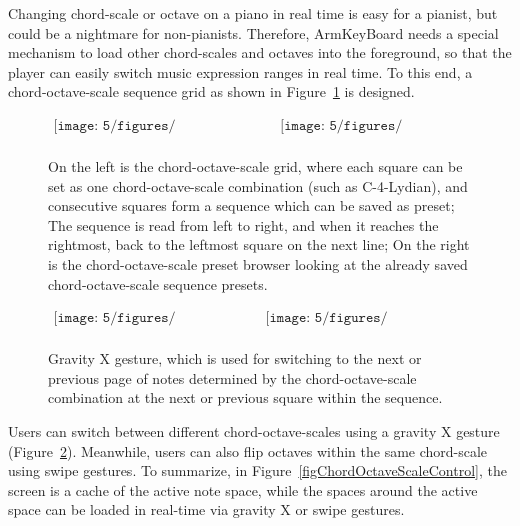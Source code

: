 Changing chord-scale or octave on a piano in real time is easy for a pianist, but could be a nightmare for non-pianists. Therefore, ArmKeyBoard needs a special mechanism to load other chord-scales and octaves into the foreground, so that the player can easily switch music expression ranges in real time. To this end, a chord-octave-scale sequence grid as shown in Figure~\ref{fig:5-cosgrid} is designed.
\begin{figure}[htbp]
\begin{center}$
\begin{array}{cc}
    \texttt{[image: 5/figures/ChordOctaveScaleGrid.PNG]} &
    \texttt{[image: 5/figures/ChordScalePreset.PNG]}\\
\end{array}$
\end{center}
\caption{On the left is the chord-octave-scale grid, where each square can be set as one chord-octave-scale
combination (such as C-4-Lydian), and consecutive squares form a sequence which can be saved as preset; The sequence is read from left to right, and when it reaches the rightmost, back to the leftmost square on the next line; On the right is the chord-octave-scale preset browser looking at the already saved chord-octave-scale sequence presets.}
\label{fig:5-cosgrid}
\end{figure}

\begin{figure}[htbp]
\begin{center}$
\begin{array}{cc}
\texttt{[image: 5/figures/Gravity0.jpg]} &
\texttt{[image: 5/figures/GravityX.jpg]} \\
\end{array}$
\end{center}
\caption{Gravity X gesture, which is used for switching to the next or previous page of notes determined by the chord-octave-scale combination at the next or previous square within the sequence.}
\label{fig:5-GravityXGesture}
\end{figure}

Users can switch between different chord-octave-scales using a gravity X gesture (Figure~\ref{fig:5-GravityXGesture}). Meanwhile, users can also flip octaves within the same chord-scale using swipe gestures. To summarize, in Figure~\ref{figChordOctaveScaleControl}, the screen is a cache of the active note space, while the spaces around the active space can be loaded in real-time via gravity X or swipe gestures.

